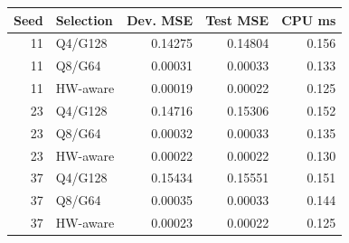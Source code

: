 \begin{tabular}{rlrrr}
\toprule
Seed & Selection & Dev. MSE & Test MSE & CPU ms \\
\midrule
11 & Q4/G128 & 0.14275 & 0.14804 & 0.156 \\
11 & Q8/G64 & 0.00031 & 0.00033 & 0.133 \\
11 & HW-aware & 0.00019 & 0.00022 & 0.125 \\
23 & Q4/G128 & 0.14716 & 0.15306 & 0.152 \\
23 & Q8/G64 & 0.00032 & 0.00033 & 0.135 \\
23 & HW-aware & 0.00022 & 0.00022 & 0.130 \\
37 & Q4/G128 & 0.15434 & 0.15551 & 0.151 \\
37 & Q8/G64 & 0.00035 & 0.00033 & 0.144 \\
37 & HW-aware & 0.00023 & 0.00022 & 0.125 \\
\bottomrule
\end{tabular}
